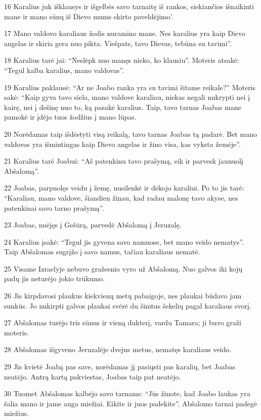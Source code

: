 \par 16 Karalius juk išklausys ir išgelbės savo tarnaitę iš rankos, siekiančios išnaikinti mane ir mano sūnų iš Dievo mums skirto paveldėjimo’. 
\par 17 Mano valdovo karaliaus žodis nuramino mane. Nes karalius yra kaip Dievo angelas ir skiria gera nuo pikta. Viešpats, tavo Dievas, tebūna su tavimi”. 
\par 18 Karalius tarė jai: “Neslėpk nuo manęs nieko, ko klausiu”. Moteris atsakė: “Tegul kalba karalius, mano valdovas”. 
\par 19 Karalius paklausė: “Ar ne Joabo ranka yra su tavimi šitame reikale?” Moteris sakė: “Kaip gyva tavo siela, mano valdove karaliau, niekas negali nukrypti nei į kairę, nei į dešinę nuo to, ką pasakė karalius. Taip, tavo tarnas Joabas mane pamokė ir įdėjo tuos žodžius į mano lūpas. 
\par 20 Norėdamas taip išdėstyti visą reikalą, tavo tarnas Joabas tą padarė. Bet mano valdovas yra išmintingas kaip Dievo angelas ir žino visa, kas vyksta žemėje”. 
\par 21 Karalius tarė Joabui: “Aš patenkinu tavo prašymą, eik ir parvesk jaunuolį Abšalomą”. 
\par 22 Joabas, parpuolęs veidu į žemę, nusilenkė ir dėkojo karaliui. Po to jis tarė: “Karaliau, mano valdove, šiandien žinau, kad radau malonę tavo akyse, nes patenkinai savo tarno prašymą”. 
\par 23 Joabas, nuėjęs į Gešūrą, parvedė Abšalomą į Jeruzalę. 
\par 24 Karalius įsakė: “Tegul jis gyvena savo namuose, bet mano veido nematys”. Taip Abšalomas sugrįžo į savo namus, tačiau karaliaus nematė. 
\par 25 Visame Izraelyje nebuvo gražesnio vyro už Abšalomą. Nuo galvos iki kojų padų jis neturėjo jokio trūkumo. 
\par 26 Jis kirpdavosi plaukus kiekvienų metų pabaigoje, nes plaukai būdavo jam sunkūs. Jo nukirpti galvos plaukai svėrė du šimtus šekelių pagal karaliaus svorį. 
\par 27 Abšalomas turėjo tris sūnus ir vieną dukterį, vardu Tamara; ji buvo graži moteris. 
\par 28 Abšalomas išgyveno Jeruzalėje dvejus metus, nematęs karaliaus veido. 
\par 29 Jis kvietė Joabą pas save, norėdamas jį pasiųsti pas karalių, bet Joabas neatėjo. Antrą kartą pakviestas, Joabas taip pat neatėjo. 
\par 30 Tuomet Abšalomas kalbėjo savo tarnams: “Jūs žinote, kad Joabo laukas yra šalia mano ir jame auga miežiai. Eikite ir juos padekite”. Abšalomo tarnai padegė miežius. 
